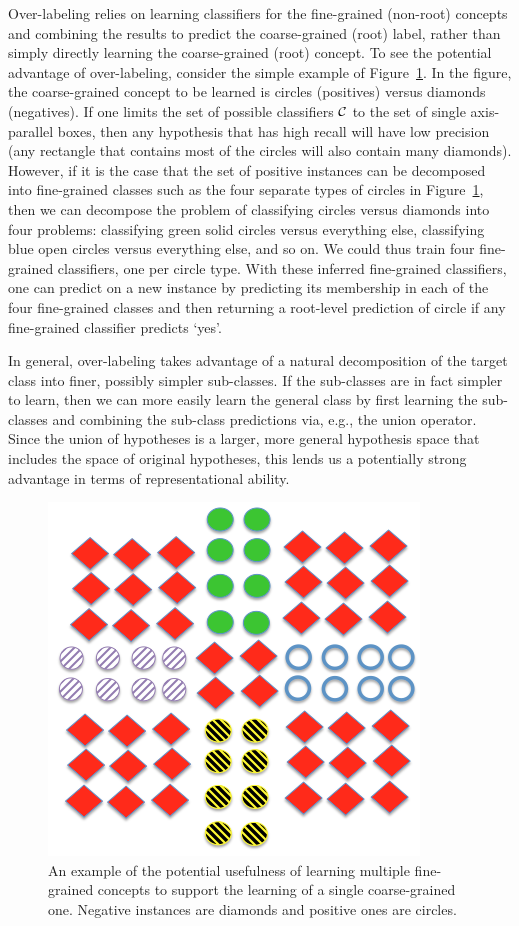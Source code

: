 \documentclass[10pt, conference, compsocconf]{IEEEtran}
\begin{document}
Over-labeling relies on learning classifiers for the fine-grained (non-root)
concepts and combining the results to predict the coarse-grained (root) label,
rather than simply directly learning the
coarse-grained (root) concept.  To see the potential advantage of over-labeling,
consider the simple example of
Figure~\ref{fig:unionex}.  In the figure, the coarse-grained concept
to be learned is circles (positives) versus diamonds (negatives).
If one limits the set of possible classifiers $\cal C$ to the set
of single axis-parallel boxes, then any hypothesis that has high recall
will have low precision (any rectangle that contains most of the circles will also
contain many diamonds).  However, if it is the case that the set
of positive instances can be decomposed into fine-grained classes
such as the four separate types of circles in Figure~\ref{fig:unionex},
then we can decompose the problem of classifying circles versus diamonds
into four problems: classifying green solid circles versus
everything else, classifying blue open circles versus everything
else, and so on.  We could thus train four fine-grained classifiers,
one per circle type.  With these inferred fine-grained classifiers,
one can predict on a new instance by predicting
its membership in each of the four fine-grained classes and then
returning a  root-level prediction of circle if any
fine-grained classifier predicts `yes'.  

In general, over-labeling takes advantage of a natural decomposition of the
target class into finer, possibly simpler sub-classes.  If the sub-classes
are in fact simpler to learn, then we can more easily learn the general class
by first learning the sub-classes and combining the sub-class predictions via, e.g., the 
union operator.  Since the union of hypotheses is a larger, more general
hypothesis space that includes the space of original hypotheses, this lends us
a potentially strong advantage in terms of representational ability.

\begin{figure}[ht]
\vskip 0.2in
\begin{center}
\centerline{\includegraphics[width=2.in]{fig/union.png}}
\caption{ An example of the potential usefulness of learning multiple
fine-grained concepts to support
the learning of a single coarse-grained one.  Negative instances are diamonds and 
positive ones are circles. 
}
\label{fig:unionex}
\end{center}
\vskip -0.2in
\end{figure} 
\end{document}
